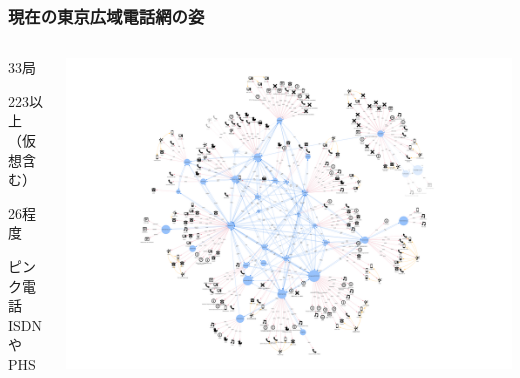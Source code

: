 \documentclass[
  lualatex,
  aspectratio=169,
  14pt
]{beamer}
\begin{document}
\begin{frame}
  \frametitle{現在の東京広域電話網の姿}

  \begin{columns}
    \begin{column}{.28\textwidth}
      \begin{description}[labelwidth=\linewidth]
        \item[交換局数]
          33局
        \item[端末数]
          223以上\\
          （仮想含む）
        \item[うち黒電話]
          26程度
        \item[その他]
          ピンク電話\\
          ISDNやPHS
      \end{description}
    \end{column}
    \begin{column}{.7\textwidth}
      \centering
      \includegraphics[height=.88\textheight]{./images/mantela.png}
    \end{column}
  \end{columns}

\end{frame}
\end{document}
